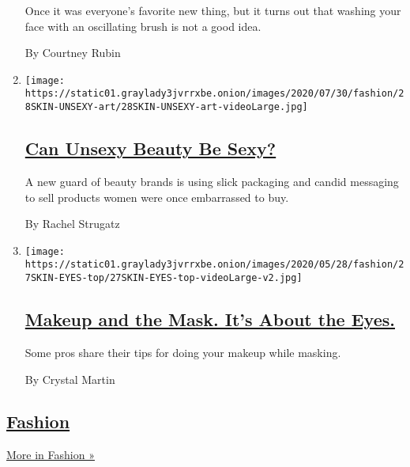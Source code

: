 \begin{enumerate}
  Once it was everyone's favorite new thing, but it turns out that
  washing your face with an oscillating brush is not a good idea.

  By Courtney Rubin
\item
  \texttt{[image: https://static01.graylady3jvrrxbe.onion/images/2020/07/30/fashion/28SKIN-UNSEXY-art/28SKIN-UNSEXY-art-videoLarge.jpg]}

  \hypertarget{can-unsexy-beauty-be-sexy-1}{%
  \subsection{\texorpdfstring{\href{/2020/07/28/style/can-unsexy-beauty-be-sexy.html}{Can
  Unsexy Beauty Be
  Sexy?}}{Can Unsexy Beauty Be Sexy?}}\label{can-unsexy-beauty-be-sexy-1}}

  A new guard of beauty brands is using slick packaging and candid
  messaging to sell products women were once embarrassed to buy.

  By Rachel Strugatz
\item
  \texttt{[image: https://static01.graylady3jvrrxbe.onion/images/2020/05/28/fashion/27SKIN-EYES-top/27SKIN-EYES-top-videoLarge-v2.jpg]}

  \hypertarget{makeup-and-the-mask-its-about-the-eyes}{%
  \subsection{\texorpdfstring{\href{/2020/05/26/style/makeup-and-the-mask-its-about-the-eyes.html}{Makeup
  and the Mask. It's About the
  Eyes.}}{Makeup and the Mask. It's About the Eyes.}}\label{makeup-and-the-mask-its-about-the-eyes}}

  Some pros share their tips for doing your makeup while masking.

  By Crystal Martin
\end{enumerate}

\hypertarget{fashion}{%
\subsection{\texorpdfstring{\href{/section/fashion}{Fashion}}{Fashion}}\label{fashion}}

\href{/section/fashion}{More in Fashion »}

